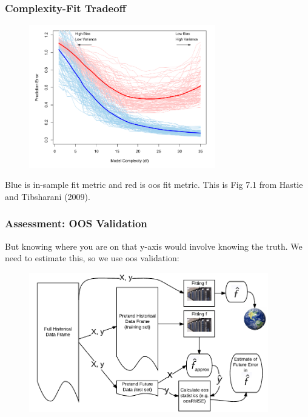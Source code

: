 \documentclass[handout]{beamer}
\begin{document}
\begin{frame}\frametitle{Complexity-Fit Tradeoff}

\begin{figure}
\centering
\includegraphics[width=3.2in]{complexity_fit_tradeoff.png}
\end{figure}

\small
Blue is in-sample fit metric and red is oos fit metric. This is Fig 7.1 from Hastie and Tibsharani (2009).


\end{frame}

\begin{frame}\frametitle{Assessment: OOS Validation}

But knowing where you are on that y-axis would involve knowing the truth. We need to estimate this, so we use oos validation:

\begin{figure}
\centering
\includegraphics[width=4.1in]{oos_validation}
\end{figure}


\end{frame}
\end{document}
